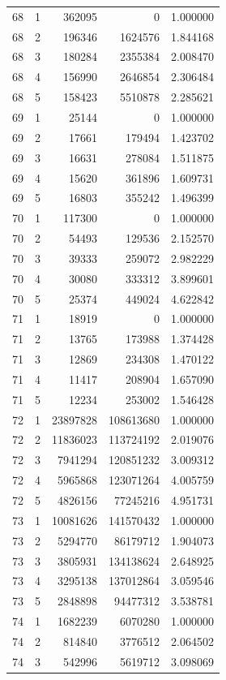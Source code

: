 \begin{longtable}{rrrrr}
68 & 1 & 362095 & 0 & 1.000000 \\
68 & 2 & 196346 & 1624576 & 1.844168 \\
68 & 3 & 180284 & 2355384 & 2.008470 \\
68 & 4 & 156990 & 2646854 & 2.306484 \\
68 & 5 & 158423 & 5510878 & 2.285621 \\
69 & 1 & 25144 & 0 & 1.000000 \\
69 & 2 & 17661 & 179494 & 1.423702 \\
69 & 3 & 16631 & 278084 & 1.511875 \\
69 & 4 & 15620 & 361896 & 1.609731 \\
69 & 5 & 16803 & 355242 & 1.496399 \\
70 & 1 & 117300 & 0 & 1.000000 \\
70 & 2 & 54493 & 129536 & 2.152570 \\
70 & 3 & 39333 & 259072 & 2.982229 \\
70 & 4 & 30080 & 333312 & 3.899601 \\
70 & 5 & 25374 & 449024 & 4.622842 \\
71 & 1 & 18919 & 0 & 1.000000 \\
71 & 2 & 13765 & 173988 & 1.374428 \\
71 & 3 & 12869 & 234308 & 1.470122 \\
71 & 4 & 11417 & 208904 & 1.657090 \\
71 & 5 & 12234 & 253002 & 1.546428 \\
72 & 1 & 23897828 & 108613680 & 1.000000 \\
72 & 2 & 11836023 & 113724192 & 2.019076 \\
72 & 3 & 7941294 & 120851232 & 3.009312 \\
72 & 4 & 5965868 & 123071264 & 4.005759 \\
72 & 5 & 4826156 & 77245216 & 4.951731 \\
73 & 1 & 10081626 & 141570432 & 1.000000 \\
73 & 2 & 5294770 & 86179712 & 1.904073 \\
73 & 3 & 3805931 & 134138624 & 2.648925 \\
73 & 4 & 3295138 & 137012864 & 3.059546 \\
73 & 5 & 2848898 & 94477312 & 3.538781 \\
74 & 1 & 1682239 & 6070280 & 1.000000 \\
74 & 2 & 814840 & 3776512 & 2.064502 \\
74 & 3 & 542996 & 5619712 & 3.098069 \\

\end{longtable}
